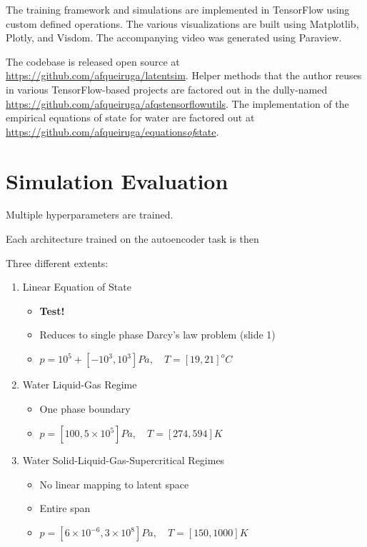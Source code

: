 \documentclass[]{article}
\begin{document}
The training framework and simulations are implemented in TensorFlow 
using custom defined operations. The various visualizations are built
using Matplotlib, Plotly, and Visdom. The accompanying video was
generated using Paraview.

The codebase is released open source at
\url{https://github.com/afqueiruga/latentsim}. Helper methods that the
author reuses in various TensorFlow-based projects are factored out in
the dully-named \url{https://github.com/afqueiruga/afqstensorflowutils}.
The implementation of the empirical equations of state for water are
factored out at
\href{https://github.com/afqueiruga/equations_of_state}{https://github.com/afqueiruga/equations\emph{of}state}.

\hypertarget{header-n3359}{%
\section{Simulation Evaluation}\label{header-n3359}}

Multiple hyperparameters are trained.

Each architecture trained on the autoencoder task is then

Three different extents:

\begin{enumerate}
\def\labelenumi{\arabic{enumi}.}
\item
  Linear Equation of State

  \begin{itemize}
  \item
    \textbf{Test!}
  \item
    Reduces to single phase Darcy's law problem (slide 1)
  \item
    \( p = 10^5+[-10^3, 10^3] Pa,\quad T = [ 19, 21 ] ^o C\)
  \end{itemize}
\item
  Water Liquid-Gas Regime

  \begin{itemize}
  \item
    One phase boundary 
  \item
    \( p = [100,5\times 10^5] Pa, \quad T = [274,594] K\)
  \end{itemize}
\item
  Water Solid-Liquid-Gas-Supercritical Regimes

  \begin{itemize}
  \item
    No linear mapping to latent space 
  \item
    Entire span
  \item
    \( p = [6\times 10^{-6},3\times 10^8]Pa, \quad T = [150,1000] K \)
  \end{itemize}
\end{enumerate}
\end{document}
